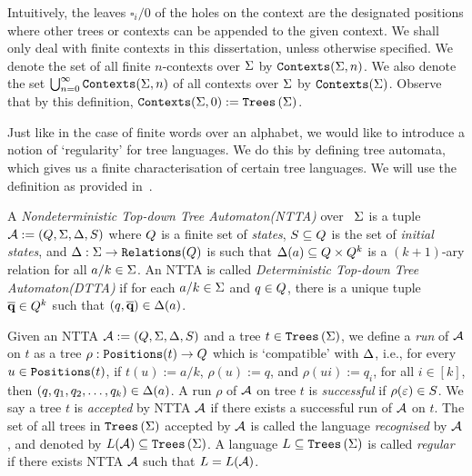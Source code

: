 Intuitively, the leaves $\square_i/0$ of the holes on the context are the designated positions where other trees or contexts can be appended to the given context. We shall only deal with finite contexts in this dissertation, unless otherwise specified. We denote the set of all finite $n$-contexts over $\Sigma$ by $\texttt{Contexts}(\Sigma, n)$. We also denote the set $\bigcup_{n=0}^\infty \texttt{Contexts}(\Sigma, n)$ of all contexts over $\Sigma$ by $\texttt{Contexts}(\Sigma)$. Observe that by this definition, $\texttt{Contexts}(\Sigma, 0) := \texttt{Trees}\left(\Sigma\right)$.

Just like in the case of finite words over an alphabet, we would like to introduce a notion of `regularity' for tree languages. We do this by defining tree automata, which gives us a finite characterisation of certain tree languages. We will use the definition as provided in~\cite{tata}.

\begin{definition}\label{def:ntta}
    A \emph{Nondeterministic Top-down Tree Automaton(NTTA)} over \rab\ $\Sigma$ is a tuple $\mathcal{A} := (Q, \Sigma, \Delta, S)$ where $Q$ is a finite set of \emph{states}, $S \subseteq Q$ is the set of \emph{initial states}, and $\Delta : \Sigma \to \texttt{Relations}(Q)$ is such that $\Delta(a) \subseteq Q \times Q^k$ is a $(k+1)$-ary relation for all $a/k \in \Sigma$. An NTTA is called \emph{Deterministic Top-down Tree Automaton(DTTA)} if for each $a/k \in \Sigma$ and $q \in Q$, there is a unique tuple $\overline{\textbf{q}} \in Q^k$ such that $(q, \overline{\textbf{q}}) \in \Delta(a)$.
\end{definition}

\begin{definition}\label{def:runAcceptanceNtta}
    Given an NTTA $\mathcal{A} := (Q, \Sigma, \Delta, S)$ and a tree $t \in \texttt{Trees}\left(\Sigma\right)$, we define a \emph{run} of $\mathcal{A}$ on $t$ as a tree $\rho : \texttt{Positions}(t) \to Q$ which is `compatible' with $\Delta$, i.e., for every $u \in \texttt{Positions}(t)$, if $t(u) := a/k$, $\rho(u) := q$, and $\rho(ui) := q_i$, for all $i \in [k]$, then $(q, q_1, q_2, \dots, q_k) \in \Delta(a)$. A run $\rho$ of $\mathcal{A}$ on tree $t$ is \emph{successful} if $\rho(\varepsilon) \in S$. We say a tree $t$ is \emph{accepted} by NTTA $\mathcal{A}$ if there exists a successful run of $\mathcal{A}$ on $t$. The set of all trees in $\texttt{Trees}\left(\Sigma\right)$ accepted by $\mathcal{A}$ is called the language \emph{recognised} by $\mathcal{A}$, and denoted by $L(\mathcal{A}) \subseteq \texttt{Trees}\left(\Sigma\right)$. A language $L \subseteq \texttt{Trees}\left(\Sigma\right)$ is called \emph{regular} if there exists NTTA $\mathcal{A}$ such that $L = L(\mathcal{A})$.
\end{definition}

